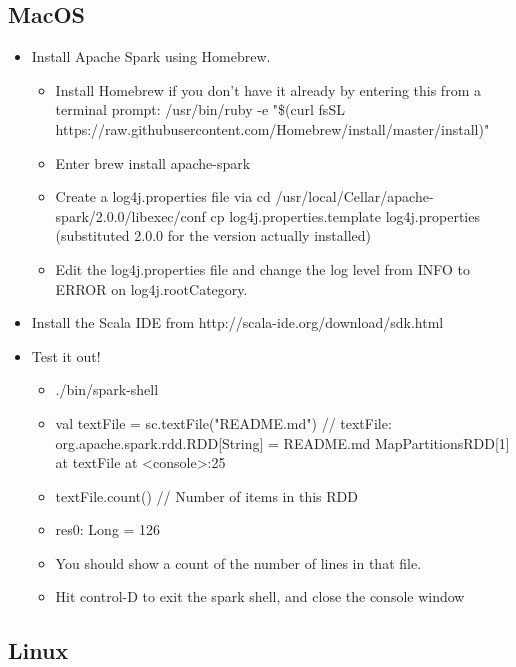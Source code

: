 \documentclass[]{article}
\begin{document}
\subsection{MacOS}
\begin{itemize}

	\item Install Apache Spark using Homebrew.
		\begin{itemize}
			\item Install Homebrew if you don’t have it already by entering this from a terminal prompt: /usr/bin/ruby -e "\$(curl \-fsSL https://raw.githubusercontent.com/Homebrew/install/master/install)"
			\item Enter brew install apache-spark
			\item Create a log4j.properties file via
			cd /usr/local/Cellar/apache-spark/2.0.0/libexec/conf
			cp log4j.properties.template log4j.properties
			(substituted 2.0.0 for the version actually installed)
			\item Edit the log4j.properties file and change the log level from INFO to ERROR on
			log4j.rootCategory.
		\end{itemize}

	\item Install the Scala IDE from http://scala-ide.org/download/sdk.html
		\item Test it out!
			\begin{itemize}
					\item ./bin/spark-shell

					\item val textFile = sc.textFile("README.md") // textFile: org.apache.spark.rdd.RDD[String] = README.md MapPartitionsRDD[1] at textFile at <console>:25


					\item textFile.count() // Number of items in this RDD
					\item res0: Long = 126

					\item You should show a count of the number of lines in that file.
					\item Hit control-D to exit the spark shell, and close the console window
			\end{itemize}

\end{itemize}


\subsection{Linux}
\end{document}
